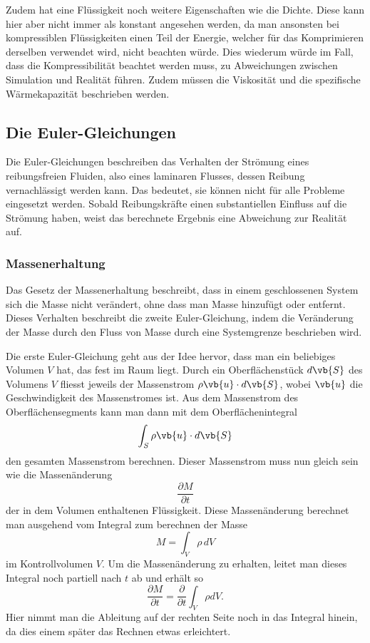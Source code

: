 Zudem hat eine Flüssigkeit noch weitere Eigenschaften wie die Dichte. 
Diese kann hier aber nicht immer als konstant angesehen werden, da man ansonsten bei kompressiblen Flüssigkeiten einen Teil der Energie, welcher für das Komprimieren derselben verwendet wird, nicht beachten würde.
Dies wiederum würde im Fall, dass die Kompressibilität beachtet werden muss, zu Abweichungen zwischen Simulation und Realität führen.
Zudem müssen die Viskosität und die spezifische Wärmekapazität beschrieben werden.

\subsection{Die Euler-Gleichungen}
Die Euler-Gleichungen beschreiben das Verhalten der Strömung eines reibungsfreien Fluiden, also eines laminaren Flusses, dessen Reibung vernachlässigt werden kann. 
Das bedeutet, sie können nicht für alle Probleme eingesetzt werden. 
Sobald Reibungskräfte einen substantiellen Einfluss auf die Strömung haben, weist das berechnete Ergebnis eine Abweichung zur Realität auf.

\subsubsection{Massenerhaltung}
Das Gesetz der Massenerhaltung beschreibt, dass in einem geschlossenen System sich die Masse nicht verändert, ohne dass man Masse hinzufügt oder entfernt. 
Dieses Verhalten beschreibt die zweite Euler-Gleichung, indem die Veränderung der Masse durch den Fluss von Masse durch eine Systemgrenze beschrieben wird.

Die erste Euler-Gleichung geht aus der Idee hervor, dass man ein beliebiges Volumen $V$ hat, das fest im Raum liegt. Durch ein Oberflächenstück 
$d \vb{S} $ 
des Volumens 
$V$
 fliesst jeweils der Massenstrom 
$ \rho\vb{u}\cdot d\vb{S}$, wobei $\vb{u}$ die Geschwindigkeit des Massenstromes ist.
Aus dem Massenstrom des Oberflächensegments kann man dann mit dem Oberflächenintegral 
\[\int_{S}\rho\vb{u}\cdot d\vb{S}\]
den gesamten Massenstrom berechnen. Dieser Massenstrom muss nun gleich sein wie die Massenänderung 
\[\frac{\partial M}{\partial t}\]
der in dem Volumen enthaltenen Flüssigkeit.
Diese Massenänderung berechnet man ausgehend vom Integral zum berechnen der Masse 
\[M 
= 
\int_{V} \rho \, dV\]
im Kontrollvolumen $V.$
Um die Massenänderung zu erhalten, leitet man dieses Integral noch partiell nach $t$ ab und erhält so
\[\frac{\partial M}{\partial t}
=
\frac{\partial }{\partial t} \int_{V}\rho dV.\]
Hier nimmt man die Ableitung auf der rechten Seite noch in das Integral hinein, da dies einem später das Rechnen etwas erleichtert.

